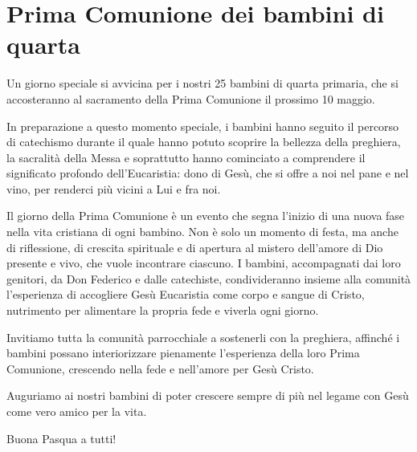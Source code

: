 \section{Prima Comunione dei bambini di quarta}

Un giorno speciale si avvicina per i nostri 25 bambini di quarta primaria, che si accosteranno al sacramento della Prima Comunione il prossimo 10 maggio.

In preparazione a questo momento speciale, i bambini hanno seguito il percorso di catechismo durante il quale hanno potuto scoprire la bellezza della preghiera, la sacralità della Messa e soprattutto hanno cominciato a comprendere il significato profondo dell'Eucaristia: dono di Gesù, che si offre a noi nel pane e nel vino, per renderci più vicini a Lui e fra noi.

Il giorno della Prima Comunione è un evento che segna l'inizio di una nuova fase nella vita cristiana di ogni bambino. Non è solo un momento di festa, ma anche di riflessione, di crescita spirituale e di apertura al mistero dell'amore di Dio presente e vivo, che vuole incontrare ciascuno. I bambini, accompagnati dai loro genitori, da Don Federico e dalle catechiste, condivideranno insieme alla comunità l'esperienza di accogliere Gesù Eucaristia come corpo e sangue di Cristo, nutrimento per alimentare la propria fede e viverla ogni giorno.

Invitiamo tutta la comunità parrocchiale a sostenerli con la preghiera, affinché i bambini possano interiorizzare pienamente l'esperienza della loro Prima Comunione, crescendo nella fede e nell'amore per Gesù Cristo.

Auguriamo ai nostri bambini di poter crescere sempre di più nel legame con Gesù come vero amico per la vita.

Buona Pasqua a tutti!


\clearpage

